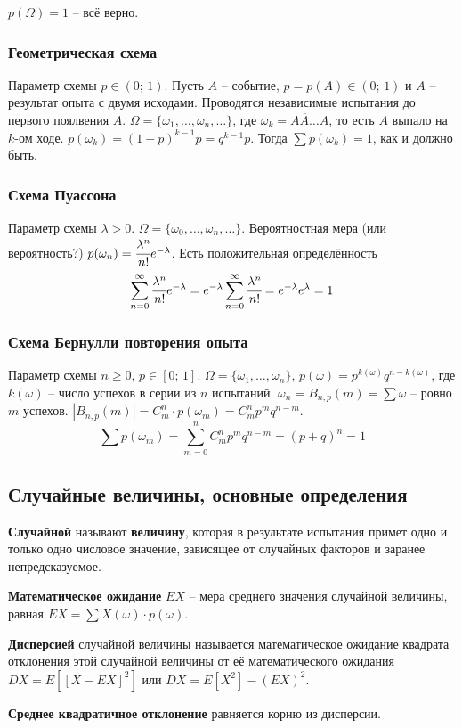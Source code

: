 \documentclass{article}
\begin{document}
$p(\Omega)=1$ -- всё верно.
\subsubsection{Геометрическая схема}
Параметр схемы $p\in(0;\,1)$. Пусть $A$ -- событие, $p=p(A)\in(0;\,1)$ и $A$ -- результат опыта с двумя исходами. Проводятся независимые испытания до первого поялвения $A$. $\Omega=\{\omega_1,\dots,\omega_n,\dots\}$, где $\omega_k=\overline{AA\dots}A$, то есть $A$ выпало на $k$-ом ходе. $p(\omega_k)=(1-p)^{k-1}p=q^{k-1}p$. Тогда $\sum p(\omega_k)=1$, как и должно быть.
\subsubsection{Схема Пуассона}
Параметр схемы $\lambda>0$. $\Omega=\{\omega_0,\dots,\omega_n,\dots\}$. Вероятностная мера (или вероятность?) $p(\omega_n)=\cfrac{\lambda^n}{n!}e^{-\lambda}$. Есть положительная определённость $$ \sum_{n=0}^{\infty}\cfrac{\lambda^n}{n!}e^{-\lambda}=e^{-\lambda}\sum_{n=0}^{\infty}\cfrac{\lambda^n}{n!}=e^{-\lambda}e^{\lambda}=1 $$

\subsubsection{Схема Бернулли повторения опыта}
Параметр схемы $n\geq0,\,p\in[0;\,1]$. $\Omega=\{\omega_1,\dots,\omega_n\},\,p(\omega)=p^{k(\omega)}q^{n-k(\omega)}$, где $k(\omega)$ -- число успехов в серии из $n$ испытаний. $\omega_n=B_{n,p}(m)=\sum\omega$ -- ровно $m$ успехов. $|B_{n,p}(m)|=C^n_m\cdot p(\omega_m)=C^n_m p^m q^{n-m}.$
$$ \sum p(\omega_m)=\sum_{m=0}^n C^n_m p^m q^{n-m}=(p+q)^n=1 $$
\subsection{Случайные величины, основные определения}
\textbf{Случайной} называют \textbf{величину}, которая в результате испытания примет одно и только одно числовое значение, зависящее от случайных факторов и заранее непредсказуемое.

\textbf{Математическое ожидание} $EX$ -- мера среднего значения случайной величины, равная $EX=\sum X(\omega)\cdot p(\omega)$.

\textbf{Дисперсией} случайной величины называется математическое ожидание квадрата отклонения этой случайной величины от её математического ожидания $DX=E[[X-EX]^2]$ или $DX=E[X^2]-(EX)^2$.

\textbf{Среднее квадратичное отклонение} равняется корню из дисперсии.
\end{document}
